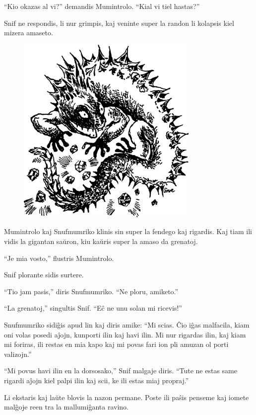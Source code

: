 ``Kio okazas al vi?'' demandis Mumintrolo. ``Kial vi tiel hastas?''

Snif ne respondis, li nur grimpis, kaj veninte super la randon li kolapsis kiel mizera amaseto.

\begin{figure}[htbp]
\centering
\includegraphics[width=249pt,height=261pt]{3-7.png}
\caption{}
\label{3-7}
\end{figure}

Mumintrolo kaj Snufmumriko klinis sin super la fendego kaj rigardis. Kaj tiam ili vidis la gigantan saŭron, kiu kaŭris super la amaso da grenatoj.

``Je mia vosto,'' flustris Mumintrolo.

Snif plorante sidis surtere.

``Tio jam pasis,'' diris Snufmumriko. ``Ne ploru, amiketo.''

``La grenatoj,'' singultis Snif. ``Eĉ ne unu solan mi ricevis!''

Snufmumriko sidiĝis apud lin kaj diris amike: ``Mi scias. Ĉio iĝas malfacila, kiam oni volas posedi aĵojn, kunporti ilin kaj havi ilin. Mi nur rigardas ilin, kaj kiam mi foriras, ili restas en mia kapo kaj mi povas fari ion pli amuzan ol porti valizojn.''

``Mi povus havi ilin en la dorsosako,'' Snif malgaje diris. ``Tute ne estas same rigardi aĵojn kiel palpi ilin kaj scii, ke ili estas miaj propraj.''

Li ekstaris kaj laŭte blovis la nazon permane. Poste ili paŝis penseme kaj iomete malĝoje reen tra la mallumiĝanta ravino.

\sectionbreak



